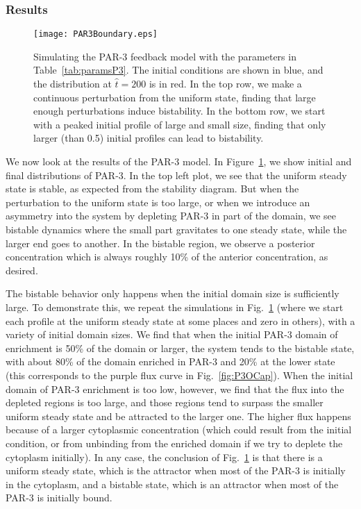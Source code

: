 \documentclass[11pt]{article}
\newcommand{\6}[1]{#1_{\text{6}}}
\newcommand{\3}[1]{#1_{\text{3}}}
\begin{document}
\subsubsection{Results}
\begin{figure}
\centering
\texttt{[image: PAR3Boundary.eps]}
\caption{\label{fig:P3FBBd}Simulating the PAR-3 feedback model with the parameters in Table\ \ref{tab:paramsP3}. The initial conditions are shown in blue, and the distribution at $\hat t = 200$ is in red. In the top row, we make a continuous perturbation from the uniform state, finding that large enough perturbations induce bistability. In the bottom row, we start with a peaked initial profile of large and small size, finding that only larger (than 0.5) initial profiles can lead to bistability.}
\end{figure}

We now look at the results of the PAR-3 model. In Figure\ \ref{fig:P3FBBd}, we show initial and final distributions of PAR-3. In the top left plot, we see that the uniform steady state is stable, as expected from the stability diagram. But when the perturbation to the uniform state is too large, or when we introduce an asymmetry into the system by depleting PAR-3 in part of the domain, we see bistable dynamics where the small part gravitates to one steady state, while the larger end goes to another. In the bistable region, we observe a posterior concentration which is always roughly 10\% of the anterior concentration, as desired.

The bistable behavior only happens when the initial domain size is sufficiently large. To demonstrate this, we repeat the simulations in Fig.\ \ref{fig:P3FBBd} (where we start each profile at the uniform steady state at some places and zero in others), with a variety of initial domain sizes. We find that when the initial PAR-3 domain of enrichment is 50\% of the domain or larger, the system tends to the bistable state, with about 80\% of the domain enriched in PAR-3 and 20\% at the lower state (this corresponds to the purple flux curve in Fig.\ \ref{fig:P3OCap}). When the initial domain of PAR-3 enrichment is too low, however, we find that the flux into the depleted regions is too large, and those regions tend to surpass the smaller uniform steady state and be attracted to the larger one. The higher flux happens because of a larger cytoplasmic concentration (which could result from the initial condition, or from unbinding from the enriched domain if we try to deplete the cytoplasm initially). In any case, the conclusion of Fig.\ \ref{fig:P3FBBd} is that there is a uniform steady state, which is the attractor when most of the PAR-3 is initially in the cytoplasm, and a bistable state, which is an attractor when most of the PAR-3 is initially bound. 
\end{document}
